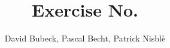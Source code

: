 \documentclass[11pt, a4paper, reqno]{scrartcl}
\begin{document}
    \title{Exercise No. }
    \author{David Bubeck, Pascal Becht, Patrick Nisbl\`e}
    \maketitle
\end{document}

